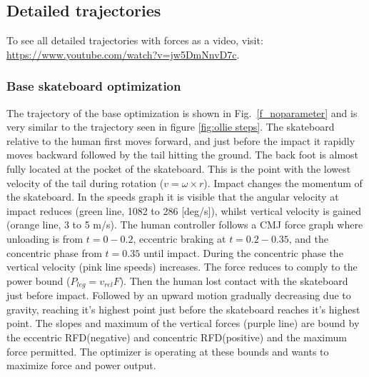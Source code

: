 \documentclass[default,iicol]{sn-jnl}
\begin{document}
\subsection{Detailed trajectories}
To see all detailed trajectories with forces as a video, visit: \url{https://www.youtube.com/watch?v=jw5DmNnvD7c}. 

\subsubsection{Base skateboard optimization}
The trajectory of the base optimization is shown in Fig.~\ref{f_noparameter} and is very similar to the trajectory seen in figure \ref{fig:ollie steps}. The skateboard relative to the human first moves forward, and just before the impact it rapidly moves backward followed by the tail hitting the ground. 
The back foot is almost fully located at the pocket of the skateboard. This is the point with the lowest velocity of the tail during rotation ($v = \omega \times r$). Impact changes the momentum of the skateboard. In the speeds graph it is visible that the angular velocity at impact reduces (green line, 1082 to 286 [deg/s]), whilst vertical velocity is gained (orange line, 3 to 5 m/s).
The human controller follows a CMJ force graph where unloading is from $t=0 - 0.2$, eccentric braking at $t=0.2-0.35$, and the concentric phase from $t=0.35$ until impact. During the concentric phase the vertical velocity (pink line speeds) increases. The force reduces to comply to the power bound ($P_{leg} = v_{rel} F$). Then the human lost contact with the skateboard just before impact. Followed by an upward motion gradually decreasing due to gravity, reaching it's highest point just before the skateboard reaches it's highest point. The slopes and maximum of the vertical forces (purple line) are bound by the eccentric RFD(negative) and concentric RFD(positive) and the maximum force permitted. The optimizer is operating at these bounds and wants to maximize force and power output. 
\end{document}
